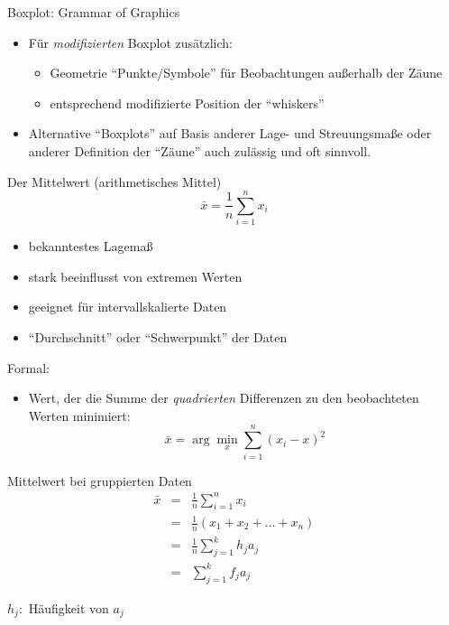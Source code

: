 \documentclass[
  10pt,
  ignorenonframetext,
]{beamer}
\providecommand{\tightlist}{%
  \setlength{\itemsep}{0pt}\setlength{\parskip}{0pt}}
\begin{document}
\begin{frame}{Boxplot: Grammar of Graphics}
\label{boxplot-grammar-of-graphics}
\begin{itemize}
\tightlist
\item
  Für \emph{modifizierten} Boxplot zusätzlich:

  \begin{itemize}
  \tightlist
  \item
    Geometrie ``Punkte/Symbole'' für Beobachtungen außerhalb der Zäune
  \item
    entsprechend modifizierte Position der ``whiskers''
  \end{itemize}
\item
  Alternative ``Boxplots'' auf Basis anderer Lage- und Streuungsmaße
  oder anderer Definition der ``Zäune'' auch zulässig und oft sinnvoll.
\end{itemize}
\end{frame}

\begin{frame}{Der Mittelwert (arithmetisches Mittel)}
\label{der-mittelwert-arithmetisches-mittel}
\begin{equation*}
      \bar x = \frac{1}{n} \sum_{i=1}^n x_i
\end{equation*}

\begin{itemize}
\tightlist
\item
  bekanntestes Lagemaß
\item
  stark beeinflusst von extremen Werten
\item
  geeignet für intervallskalierte Daten
\item
  ``Durchschnitt'' oder ``Schwerpunkt'' der Daten
\end{itemize}

Formal:

\begin{itemize}
\tightlist
\item
  Wert, der die Summe der \emph{quadrierten} Differenzen zu den
  beobachteten Werten minimiert:
  \[\bar x = \arg\min_x \sum^n_{i=1} (x_i - x)^2\]
\end{itemize}
\end{frame}

\begin{frame}{Mittelwert bei gruppierten Daten}
\label{mittelwert-bei-gruppierten-daten}
\begin{eqnarray*}
  \bar x &=& \frac{1}{n} \sum_{i=1}^n x_i \\
             &=& \frac{1}{n}(x_1 + x_2 + \ldots + x_n) \\
             &=& \frac{1}{n} \sum_{j=1}^k h_j a_j \\
             &=& \sum_{j=1}^k f_j a_j
\end{eqnarray*}

\(h_j:\) Häufigkeit von \(a_j\)
\end{frame}
\end{document}
